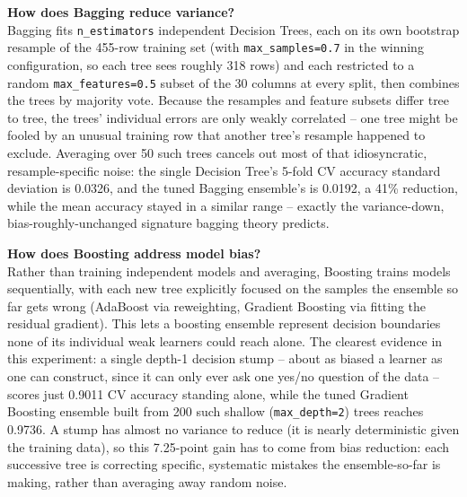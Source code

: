 \documentclass[11pt,a4paper]{article}
\begin{document}
\textbf{How does Bagging reduce variance?}\\
Bagging fits \texttt{n\_estimators} independent Decision Trees, each on its own bootstrap resample of the 455-row training set (with \texttt{max\_samples=0.7} in the winning configuration, so each tree sees roughly 318 rows) and each restricted to a random \texttt{max\_features=0.5} subset of the 30 columns at every split, then combines the trees by majority vote. Because the resamples and feature subsets differ tree to tree, the trees' individual errors are only weakly correlated -- one tree might be fooled by an unusual training row that another tree's resample happened to exclude. Averaging over 50 such trees cancels out most of that idiosyncratic, resample-specific noise: the single Decision Tree's 5-fold CV accuracy standard deviation is 0.0326, and the tuned Bagging ensemble's is 0.0192, a 41\% reduction, while the mean accuracy stayed in a similar range -- exactly the variance-down, bias-roughly-unchanged signature bagging theory predicts.

\textbf{How does Boosting address model bias?}\\
Rather than training independent models and averaging, Boosting trains models sequentially, with each new tree explicitly focused on the samples the ensemble so far gets wrong (AdaBoost via reweighting, Gradient Boosting via fitting the residual gradient). This lets a boosting ensemble represent decision boundaries none of its individual weak learners could reach alone. The clearest evidence in this experiment: a single depth-1 decision stump -- about as biased a learner as one can construct, since it can only ever ask one yes/no question of the data -- scores just 0.9011 CV accuracy standing alone, while the tuned Gradient Boosting ensemble built from 200 such shallow (\texttt{max\_depth=2}) trees reaches 0.9736. A stump has almost no variance to reduce (it is nearly deterministic given the training data), so this 7.25-point gain has to come from bias reduction: each successive tree is correcting specific, systematic mistakes the ensemble-so-far is making, rather than averaging away random noise.
\end{document}
